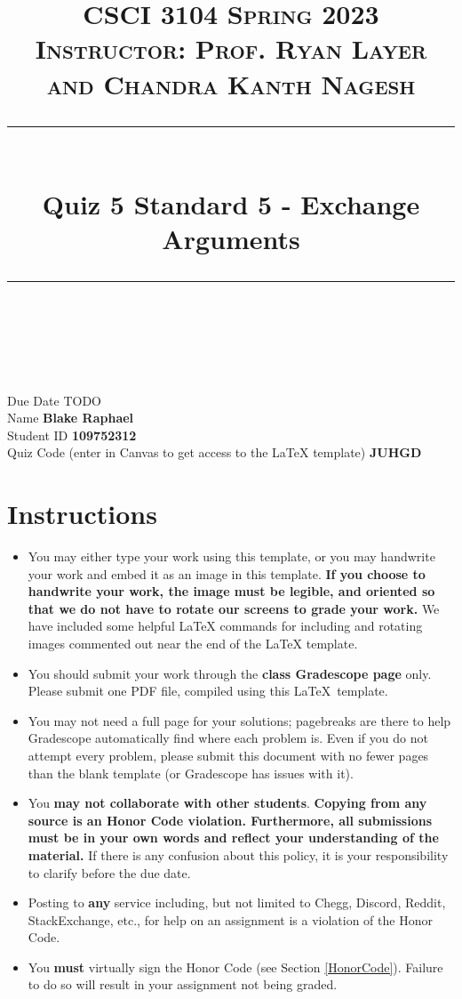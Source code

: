 \documentclass[11pt]{article}
\title{
\normalfont \normalsize 
\textsc{CSCI 3104 Spring 2023 \\ 
Instructor: Prof. Ryan Layer and Chandra Kanth Nagesh} \\
[10pt] 
\rule{\linewidth}{0.5pt} \\[6pt] 
\huge Quiz 5 Standard 5 - Exchange Arguments \\
\rule{\linewidth}{2pt}  \\[10pt]
}
\date{}
\theoremstyle{definition}
\theoremstyle{definition}
\theoremstyle{definition}
\begin{document}
\maketitle


\noindent
Due Date \dotfill TODO \\
Name \dotfill \textbf{Blake Raphael} \\
Student ID \dotfill \textbf{109752312} \\
Quiz Code (enter in Canvas to get access to the LaTeX template) \dotfill \textbf{JUHGD}


\tableofcontents

\section*{Instructions}
 \begin{itemize}
	\item You may either type your work using this template, or you may handwrite your work and embed it as an image in this template. \textbf{If you choose to handwrite your work, the image must be legible, and oriented so that we do not have to rotate our screens to grade your work.} We have included some helpful LaTeX commands for including and rotating images commented out near the end of the LaTeX template.
	\item You should submit your work through the \textbf{class Gradescope page} only. Please submit one PDF file, compiled using this \LaTeX \ template.
	\item You may not need a full page for your solutions; pagebreaks are there to help Gradescope automatically find where each problem is. Even if you do not attempt every problem, please submit this document with no fewer pages than the blank template (or Gradescope has issues with it).

	\item You \textbf{may not collaborate with other students}. \textbf{Copying from any source is an Honor Code violation. Furthermore, all submissions must be in your own words and reflect your understanding of the material.} If there is any confusion about this policy, it is your responsibility to clarify before the due date. 

	\item Posting to \textbf{any} service including, but not limited to Chegg, Discord, Reddit, StackExchange, etc., for help on an assignment is a violation of the Honor Code.

	\item You \textbf{must} virtually sign the Honor Code (see Section \ref{HonorCode}). Failure to do so will result in your assignment not being graded.
\end{itemize}
\end{document}
